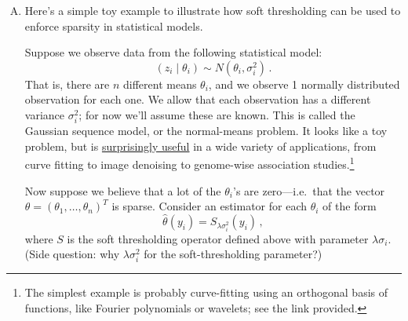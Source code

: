 \documentclass{article}
\begin{document}
\begin{enumerate}[(A)]
\item Here's a simple toy example to illustrate how soft thresholding can be used to enforce sparsity in statistical models.

Suppose we observe data from the following statistical model:
$$
(z_{i} \mid \theta_i) \sim N(\theta_i, \sigma^2_i) \, .
$$
That is, there are $n$ different means $\theta_i$, and we observe 1 normally distributed observation for each one.  We allow that each observation has a different variance $\sigma^2_i$; for now we'll assume these are known.  This is called the Gaussian sequence model, or the normal-means problem.  It looks like a toy problem, but is \href{http://statweb.stanford.edu/~imj/GE06-11-13.pdf}{surprisingly useful} in a wide variety of applications, from curve fitting to image denoising to genome-wise association studies.\footnote{The simplest example is probably curve-fitting using an orthogonal basis of functions, like Fourier polynomials or wavelets; see the link provided.}

Now suppose we believe that a lot of the $\theta_i$'s are zero---i.e.~that the vector $\theta = (\theta_1, \ldots, \theta_n)^T$ is sparse.  Consider an estimator for each $\theta_i$ of the form
$$
\widehat{\theta}(y_i) = S_{\lambda \sigma_i^2}(y_i) \, ,
$$
where $S$ is the soft thresholding operator defined above with parameter $\lambda \sigma_i$.  (Side question: why $\lambda \sigma_i^2$ for the soft-thresholding parameter?)


\end{enumerate}
\end{document}
